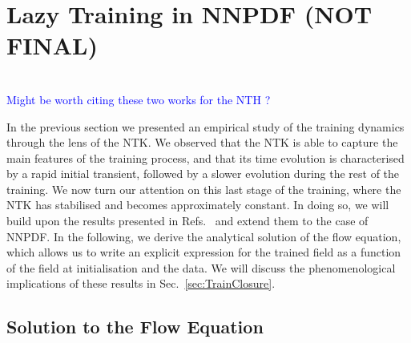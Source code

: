 \section{Lazy Training in NNPDF (NOT FINAL)}
\label{sec:LazyTraining}

\begin{center}
  \\
  \textcolor{blue}{Might be worth citing these two works for the NTH
  \cite{huang2019ddnn}\cite{Dyer:2019uzd}?}
\end{center}

\noindent In the previous section we presented an empirical study of the
training dynamics through the lens of the NTK. We observed that the NTK is able
to capture the main features of the training process, and that its time
evolution is characterised by a rapid initial transient, followed by a slower
evolution during the rest of the training. We now turn our attention on this
last stage of the training, where the NTK has stabilised and becomes
approximately constant. In doing so, we will build upon the results presented in
Refs.~\cite{jacot2018neural,lee2019wide} and extend them to the case of NNPDF.
In the following, we derive the analytical solution of the flow equation, which
allows us to write an explicit expression for the trained field as a function of
the field at initialisation and the data. We will discuss the phenomenological
implications of these results in Sec.~\ref{sec:TrainClosure}.

\subsection{Solution to the Flow Equation}
\label{sec:Lazy}

